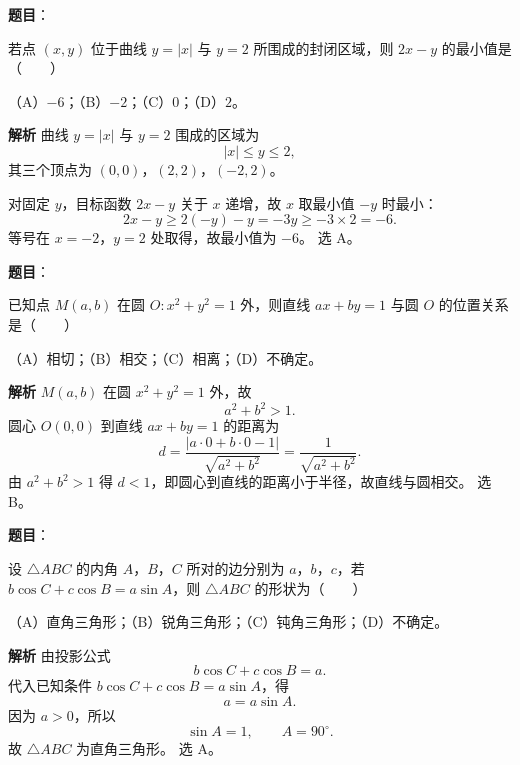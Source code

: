 \begin{answer}

\textbf{题目}：

若点 $(x,y)$ 位于曲线 $y=|x|$ 与 $y=2$ 所围成的封闭区域，则 $2x-y$ 的最小值是\mbox{（　　）}

（A）$-6$；（B）$-2$；（C）$0$；（D）$2$。

\textbf{解析}
曲线 $y=|x|$ 与 $y=2$ 围成的区域为
\nopagebreak[4]
\[|x|\leqslant y\leqslant2,\]
其三个顶点为 $(0,0)$，$(2,2)$，$(-2,2)$。

对固定 $y$，目标函数 $2x-y$ 关于 $x$ 递增，故 $x$ 取最小值 $-y$ 时最小：
\nopagebreak[4]
\[2x-y\geqslant2(-y)-y=-3y\geqslant-3\times2=-6.\]
等号在 $x=-2$，$y=2$ 处取得，故最小值为 $-6$。
选 A。


\end{answer}
\begin{answer}

\textbf{题目}：

已知点 $M(a,b)$ 在圆 $O:x^2+y^2=1$ 外，则直线 $ax+by=1$ 与圆 $O$ 的位置关系是\mbox{（　　）}

（A）相切；（B）相交；（C）相离；（D）不确定。

\textbf{解析}
$M(a,b)$ 在圆 $x^2+y^2=1$ 外，故
\nopagebreak[4]
\[a^2+b^2>1.\]
圆心 $O(0,0)$ 到直线 $ax+by=1$ 的距离为
\nopagebreak[4]
\[d=\frac{|a\cdot0+b\cdot0-1|}{\sqrt{a^2+b^2}}=\frac1{\sqrt{a^2+b^2}}.\]
由 $a^2+b^2>1$ 得 $d<1$，即圆心到直线的距离小于半径，故直线与圆相交。
选 B。


\end{answer}
\begin{answer}

\textbf{题目}：

设 $\triangle ABC$ 的内角 $A$，$B$，$C$ 所对的边分别为 $a$，$b$，$c$，若 $b\cos C+c\cos B=a\sin A$，则 $\triangle ABC$ 的形状为\mbox{（　　）}

（A）直角三角形；（B）锐角三角形；（C）钝角三角形；（D）不确定。

\textbf{解析}
由投影公式
\nopagebreak[4]
\[b\cos C+c\cos B=a.\]
代入已知条件 $b\cos C+c\cos B=a\sin A$，得
\nopagebreak[4]
\[a=a\sin A.\]
因为 $a>0$，所以
\nopagebreak[4]
\[\sin A=1,\qquad A=90^\circ.\]
故 $\triangle ABC$ 为直角三角形。
选 A。


\end{answer}
